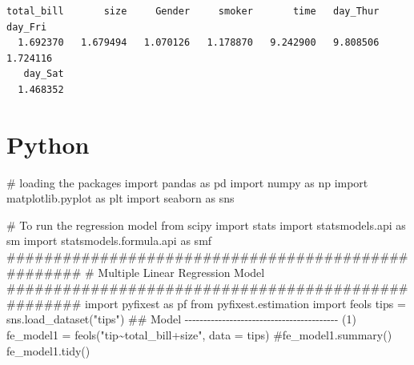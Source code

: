\documentclass[
  letterpaper,
  DIV=11,
  numbers=noendperiod]{scrreprt}
\newenvironment{Shaded}{\begin{snugshade}}{\end{snugshade}}
\newcommand{\CommentTok}[1]{\textcolor[rgb]{0.37,0.37,0.37}{#1}}
\newcommand{\ImportTok}[1]{\textcolor[rgb]{0.00,0.46,0.62}{#1}}
\newcommand{\NormalTok}[1]{\textcolor[rgb]{0.00,0.23,0.31}{#1}}
\newcommand{\OperatorTok}[1]{\textcolor[rgb]{0.37,0.37,0.37}{#1}}
\newcommand{\StringTok}[1]{\textcolor[rgb]{0.13,0.47,0.30}{#1}}
\begin{document}
\begin{verbatim}
total_bill       size     Gender     smoker       time   day_Thur    day_Fri 
  1.692370   1.679494   1.070126   1.178870   9.242900   9.808506   1.724116 
   day_Sat 
  1.468352 
\end{verbatim}

\section{Python}

\begin{Shaded}
\begin{Highlighting}[]
\CommentTok{\# loading the packages}
\ImportTok{import}\NormalTok{ pandas }\ImportTok{as}\NormalTok{ pd}
\ImportTok{import}\NormalTok{ numpy }\ImportTok{as}\NormalTok{ np}
\ImportTok{import}\NormalTok{ matplotlib.pyplot }\ImportTok{as}\NormalTok{ plt}
\ImportTok{import}\NormalTok{ seaborn }\ImportTok{as}\NormalTok{ sns}
\end{Highlighting}
\end{Shaded}

\begin{Shaded}
\begin{Highlighting}[]
\CommentTok{\# To run the regression model}
\ImportTok{from}\NormalTok{ scipy }\ImportTok{import}\NormalTok{ stats}
\ImportTok{import}\NormalTok{ statsmodels.api }\ImportTok{as}\NormalTok{ sm}
\ImportTok{import}\NormalTok{ statsmodels.formula.api }\ImportTok{as}\NormalTok{ smf}
\CommentTok{\#\#\#\#\#\#\#\#\#\#\#\#\#\#\#\#\#\#\#\#\#\#\#\#\#\#\#\#\#\#\#\#\#\#\#\#\#\#\#\#\#\#\#\#\#\#\#\#\#\#\#}
\CommentTok{\# Multiple Linear Regression Model }
\CommentTok{\#\#\#\#\#\#\#\#\#\#\#\#\#\#\#\#\#\#\#\#\#\#\#\#\#\#\#\#\#\#\#\#\#\#\#\#\#\#\#\#\#\#\#\#\#\#\#\#\#\#\#}
\ImportTok{import}\NormalTok{ pyfixest }\ImportTok{as}\NormalTok{ pf}
\ImportTok{from}\NormalTok{ pyfixest.estimation }\ImportTok{import}\NormalTok{ feols}
\NormalTok{tips }\OperatorTok{=}\NormalTok{ sns.load\_dataset(}\StringTok{"tips"}\NormalTok{)}
\CommentTok{\#\# Model {-}{-}{-}{-}{-}{-}{-}{-}{-}{-}{-}{-}{-}{-}{-}{-}{-}{-}{-}{-}{-}{-}{-}{-}{-}{-}{-}{-}{-}{-}{-}{-}{-}{-}{-}{-}{-}{-}{-}{-}{-} (1)}
\NormalTok{fe\_model1 }\OperatorTok{=}\NormalTok{ feols(}\StringTok{"tip\textasciitilde{}total\_bill+size"}\NormalTok{, data }\OperatorTok{=}\NormalTok{ tips)}
\CommentTok{\#fe\_model1.summary()}
\NormalTok{fe\_model1.tidy()}
\end{Highlighting}
\end{Shaded}
\end{document}
